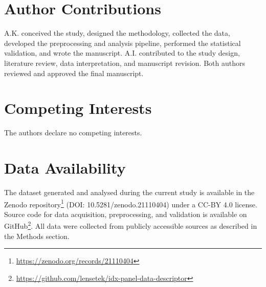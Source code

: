 \documentclass[11pt,a4paper]{article}
\begin{document}
\section*{Author Contributions}

A.K. conceived the study, designed the methodology, collected the data, developed the preprocessing and analysis pipeline, performed the statistical validation, and wrote the manuscript. A.I. contributed to the study design, literature review, data interpretation, and manuscript revision. Both authors reviewed and approved the final manuscript.

\section*{Competing Interests}

The authors declare no competing interests.

\section*{Data Availability}

The dataset generated and analysed during the current study is available in the Zenodo repository\footnote{\url{https://zenodo.org/records/21110404}} (DOI: 10.5281/zenodo.21110404) under a CC-BY 4.0 license. Source code for data acquisition, preprocessing, and validation is available on GitHub\footnote{\url{https://github.com/lensetek/idx-panel-data-descriptor}}. All data were collected from publicly accessible sources as described in the Methods section.
\end{document}
